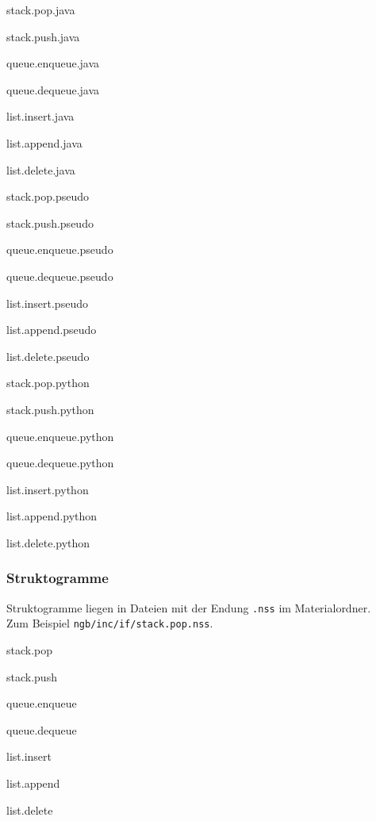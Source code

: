 \begin{multicols}{2}\ttfamily
	\begin{smallitemize}
		\item stack.pop.java
		\item stack.push.java
		\item queue.enqueue.java
		\item queue.dequeue.java
		\item list.insert.java
		\item list.append.java
		\item list.delete.java
		\item stack.pop.pseudo
		\item stack.push.pseudo
		\item queue.enqueue.pseudo
		\item queue.dequeue.pseudo
		\item list.insert.pseudo
		\item list.append.pseudo
		\item list.delete.pseudo
		\item stack.pop.python
		\item stack.push.python
		\item queue.enqueue.python
		\item queue.dequeue.python
		\item list.insert.python
		\item list.append.python
		\item list.delete.python
	\end{smallitemize}
\end{multicols}

\subsubsection{Struktogramme}
Struktogramme liegen in Dateien mit der Endung \texttt{.nss} im Materialordner. \\Zum Beispiel \texttt{ngb/inc/if/stack.pop.nss}.

\begin{multicols}{2}\ttfamily
	\begin{smallitemize}
		\item stack.pop
		\item stack.push
		\item queue.enqueue
		\item queue.dequeue
		\item list.insert
		\item list.append
		\item list.delete
	\end{smallitemize}
\end{multicols}

